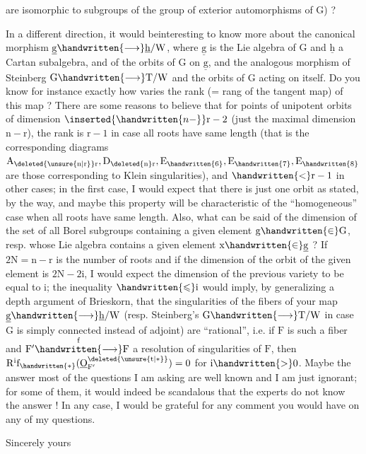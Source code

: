 are isomorphic to subgroups of the group of exterior automorphisms of $\mathrm{G}$) ?

In a different direction, it would be\handwritten{\raisebox{.6ex}{$\vert$}}interesting to know more about the canonical morphism $\underline{\mathrm{g}}\handwritten{\longrightarrow}\underline{\mathrm{h}}/\mathrm{W}$, where $\underline{\mathrm{g}}$ is the Lie algebra of $\mathrm{G}$ and $\underline{\mathrm{h}}$ a Cartan subalgebra, and of the orbits of $\mathrm{G}$ on $\underline{\mathrm{g}}$, and the analogous morphism of Steinberg $\mathrm{G}\handwritten{\longrightarrow}\mathrm{T}/\mathrm{W}$ and the orbits of $\mathrm{G}$ acting on itself. Do you know for instance exactly how varies the rank (= rang of the tangent map) of this  map ? There are some reasons to believe that  for points of unipotent orbits of dimension $\inserted{\handwritten{n-}}\mathrm{r}-2$ (just  the maximal dimension $\mathrm{n}-\mathrm{r}$), the rank is $\mathrm{r}-1$ in case all roots have same length (that is the corresponding diagrams $\mathrm{A}_{\deleted{\unsure{\mathrm{n}|\mathrm{r}}}\mathrm{r}},\mathrm{D}_{\deleted{\mathrm{n}}\mathrm{r}},\mathrm{E}_{\handwritten{6}},\mathrm{E}_{\handwritten{7}},\mathrm{E}_{\handwritten{8}}$ are those corresponding to Klein singularities), and $\handwritten{<}\mathrm{r}-1$ in  other cases; in the first case, I would expect that there is just one orbit as stated, by the way, and maybe this property will be characteristic of the ``homogeneous'' case when all roots have same length. Also, what can be said of the dimension of the set of all Borel subgroups containing a given element $\mathrm{g}\handwritten{\in}\mathrm{G}$, resp. whose Lie algebra contains a given element $\mathrm{x}\handwritten{\in}\underline{\mathrm{g}}$ ? If $2\mathrm{N}=\mathrm{n}-\mathrm{r}$ is the number of roots and if the dimension of the orbit of the given element is $2\mathrm{N}-2\mathrm{i}$, I would expect the dimension of the previous variety to be equal to $\mathrm{i}$; the inequality $\handwritten{\leqslant}\mathrm{i}$ would imply, by generalizing a depth argument of Brieskorn, that the singularities of the fibers of your map $\underline{\mathrm{g}}\handwritten{\longrightarrow}\underline{\mathrm{h}}/\mathrm{W}$ (resp. Steinberg's $\mathrm{G}\handwritten{\longrightarrow}\mathrm{T}/\mathrm{W}$ in case $\mathrm{G}$ is simply connected instead of adjoint) are ``rational'', i.e. if $\mathrm{F}$ is such a fiber and $\mathrm{F}'\overset{\mathrm{f}}{\handwritten{\longrightarrow}}\mathrm{F}$ a resolution of singularities of $\mathrm{F}$, then $\mathrm{R}^{\mathrm{i}}\mathrm{f}_{\handwritten{*}}(\underline{\mathrm{O}}_{\mathrm{F}'}^{\deleted{\unsure{\mathrm{t}|*}}})=0$ for $\mathrm{i}\handwritten{>}0$. Maybe the answer  most of the questions I am asking are well known and I am just ignorant; for some of them, it would indeed be scandalous that the experts do not know the answer ! In any case, I would be grateful for any comment you would have on any of my questions.

Sincerely yours\\
\\
